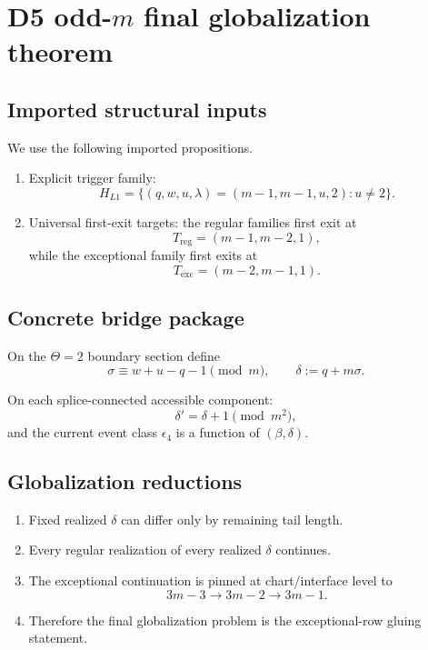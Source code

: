 \section{D5 odd-$m$ final globalization theorem}

\subsection{Imported structural inputs}

We use the following imported propositions.

\begin{enumerate}
\item Explicit trigger family:
\[
H_{L1}=\{(q,w,u,\lambda)=(m-1,m-1,u,2):u\neq 2\}.
\]

\item Universal first-exit targets:
the regular families first exit at
\[
T_{\mathrm{reg}}=(m-1,m-2,1),
\]
while the exceptional family first exits at
\[
T_{\mathrm{exc}}=(m-2,m-1,1).
\]
\end{enumerate}

\subsection{Concrete bridge package}

On the $\Theta=2$ boundary section define
\[
\sigma \equiv w+u-q-1 \pmod m,
\qquad
\delta := q + m\sigma.
\]

On each splice-connected accessible component:
\[
\delta'=\delta+1 \pmod{m^2},
\]
and the current event class $\epsilon_4$ is a function of $(\beta,\delta)$.

\subsection{Globalization reductions}

\begin{enumerate}
\item Fixed realized $\delta$ can differ only by remaining tail length.
\item Every regular realization of every realized $\delta$ continues.
\item The exceptional continuation is pinned at chart/interface level to
\[
3m-3 \to 3m-2 \to 3m-1.
\]
\item Therefore the final globalization problem is the exceptional-row gluing
statement.
\end{enumerate}

